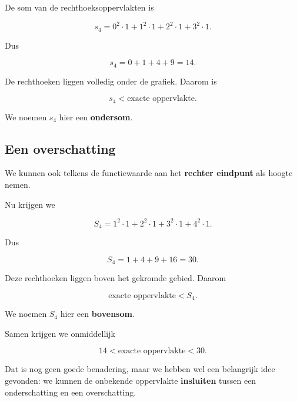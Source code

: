 \documentclass{ximera}
\begin{document}
De som van de rechthoeksoppervlakten is

\[
s_4
=
0^2\cdot1
+
1^2\cdot1
+
2^2\cdot1
+
3^2\cdot1.
\]

Dus

\[
s_4=0+1+4+9=14.
\]

De rechthoeken liggen volledig onder de grafiek. Daarom is

\[
\boxed{s_4<\text{exacte oppervlakte}}.
\]

We noemen \(s_4\) hier een \textbf{ondersom}.

\subsection*{Een overschatting}

We kunnen ook telkens de functiewaarde aan het \textbf{rechter eindpunt}
als hoogte nemen.

\begin{center}
\end{center}

Nu krijgen we

\[
S_4
=
1^2\cdot1
+
2^2\cdot1
+
3^2\cdot1
+
4^2\cdot1.
\]

Dus

\[
S_4=1+4+9+16=30.
\]

Deze rechthoeken liggen boven het gekromde gebied. Daarom

\[
\boxed{\text{exacte oppervlakte}<S_4}.
\]

We noemen \(S_4\) hier een \textbf{bovensom}.

Samen krijgen we onmiddellijk

\[
\boxed{
14<\text{exacte oppervlakte}<30
}.
\]

Dat is nog geen goede benadering, maar we hebben wel een belangrijk
idee gevonden: we kunnen de onbekende oppervlakte \textbf{insluiten}
tussen een onderschatting en een overschatting.
\end{document}
